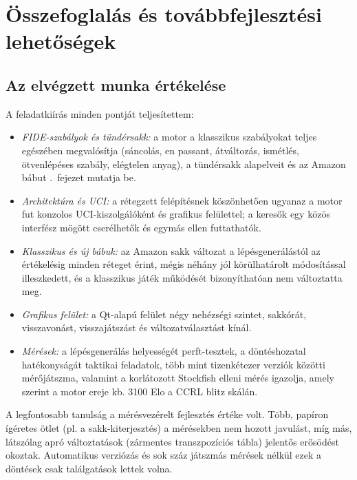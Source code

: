 \chapter{Összefoglalás és továbbfejlesztési lehetőségek}\label{chap:conclusion}

\section{Az elvégzett munka értékelése}

A feladatkiírás minden pontját teljesítettem:
\begin{itemize}
	\item \emph{FIDE-szabályok és tündérsakk:} a motor a klasszikus szabályokat teljes egészében megvalósítja (sáncolás, en passant, átváltozás, ismétlés, ötvenlépéses szabály, elégtelen anyag), a tündérsakk alapelveit és az Amazon bábut .~fejezet mutatja be.
	\item \emph{Architektúra és UCI:} a rétegzett felépítésnek köszönhetően ugyanaz a motor fut konzolos UCI-kiszolgálóként és grafikus felülettel; a keresők egy közös interfész mögött cserélhetők és egymás ellen futtathatók.
	\item \emph{Klasszikus és új bábuk:} az Amazon sakk változat a lépésgenerálástól az értékelésig minden réteget érint, mégis néhány jól körülhatárolt módosítással illeszkedett, és a klasszikus játék működését bizonyíthatóan nem változtatta meg.
	\item \emph{Grafikus felület:} a Qt-alapú felület négy nehézségi szintet, sakkórát, visszavonást, visszajátszást és változatválasztást kínál.
	\item \emph{Mérések:} a lépésgenerálás helyességét perft-tesztek, a döntéshozatal hatékonyságát taktikai feladatok, több mint tizenkétezer verziók közötti mérőjátszma, valamint a korlátozott Stockfish elleni mérés igazolja, amely szerint a motor ereje kb. 3100 Elo a CCRL blitz skálán.
\end{itemize}

A legfontosabb tanulság a mérésvezérelt fejlesztés értéke volt. Több, papíron ígéretes ötlet (pl. a sakk-kiterjesztés) a mérésekben nem hozott javulást, míg más, látszólag apró változtatások (zármentes transzpozíciós tábla) jelentős erősödést okoztak. Automatikus verziózás és sok száz játszmás mérések nélkül ezek a döntések csak találgatások lettek volna.

